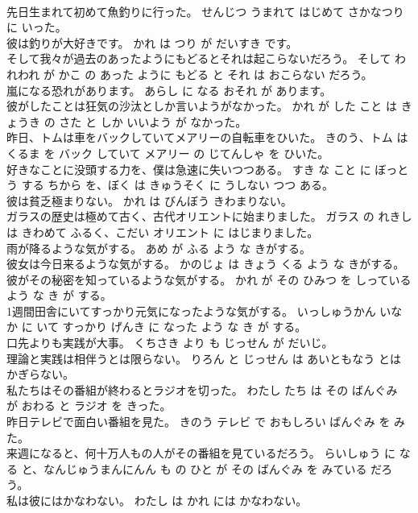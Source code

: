 \documentclass[8pt]{extreport}
\begin{document}
\begin{CJK}{UTF8}{min}
\\	先日生まれて初めて魚釣りに行った。	せんじつ うまれて はじめて さかなつり に いった。	
\\	彼は釣りが大好きです。	かれ は つり が だいすき です。	
\\	そして我々が過去のあったようにもどるとそれは起こらないだろう。	そして われわれ が かこ の あった ように もどる と それ は おこらない だろう。	
\\	嵐になる恐れがあります。	あらし に なる おそれ が あります。	
\\	彼がしたことは狂気の沙汰としか言いようがなかった。	かれ が した こと は きょうき の さた と しか いいよう が なかった。	
\\	昨日、トムは車をバックしていてメアリーの自転車をひいた。	きのう、トム は くるま を バック していて メアリー の じてんしゃ を ひいた。	
\\	好きなことに没頭する力を、僕は急速に失いつつある。	すき な こと に ぼっとう する ちから を、ぼく は きゅうそく に うしない つつ ある。	
\\	彼は貧乏極まりない。	かれ は びんぼう きわまりない。	
\\	ガラスの歴史は極めて古く、古代オリエントに始まりました。	ガラス の れきし は きわめて ふるく、こだい オリエント に はじまりました。	
\\	雨が降るような気がする。	あめ が ふる よう な きがする。	
\\	彼女は今日来るような気がする。	かのじょ は きょう くる よう な きがする。	
\\	彼がその秘密を知っているような気がする。	かれ が その ひみつ を しっている よう な き が する。	
\\	1週間田舎にいてすっかり元気になったような気がする。	いっしゅうかん いなか に いて すっかり げんき に なった よう な き が する。	
\\	口先よりも実践が大事。	くちさき より も じっせん が だいじ。	
\\	理論と実践は相伴うとは限らない。	りろん と じっせん は あいともなう とは かぎらない。	
\\	私たちはその番組が終わるとラジオを切った。	わたし たち は その ばんぐみ が おわる と ラジオ を きった。	
\\	昨日テレビで面白い番組を見た。	きのう テレビ で おもしろい ばんぐみ を みた。	
\\	来週になると、何十万人もの人がその番組を見ているだろう。	らいしゅう に なる と、なんじゅうまんにんん も の ひと が その ばんぐみ を みている だろう。	
\\	私は彼にはかなわない。	わたし は かれ には かなわない。	

\end{CJK}
\end{document}
